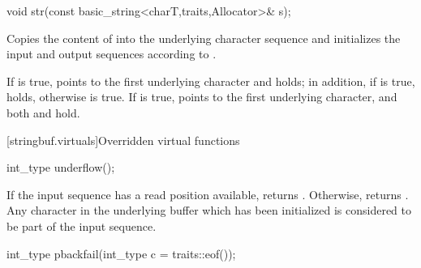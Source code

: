 %
%
\begin{itemdecl}
void str(const basic_string<charT,traits,Allocator>& s);
\end{itemdecl}

\begin{itemdescr}
\pnum
\effects
Copies the content of  into the  underlying character
sequence and initializes the input and output sequences according to .

\pnum
\postconditions If  is true,  points to the
first underlying character and   holds; in
addition, if  is true,
holds, otherwise  is true. If  is
true,  points to the first underlying character, and both  and  hold.
\end{itemdescr}

[stringbuf.virtuals]{Overridden virtual functions}

%
\begin{itemdecl}
int_type underflow();
\end{itemdecl}

\begin{itemdescr}
\pnum
\returns
If the input sequence has a read position available,
returns
.
Otherwise, returns
.
Any character in the underlying buffer which has been initialized is considered
to be part of the input sequence. 
\end{itemdescr}

%
\begin{itemdecl}
int_type pbackfail(int_type c = traits::eof());
\end{itemdecl}

